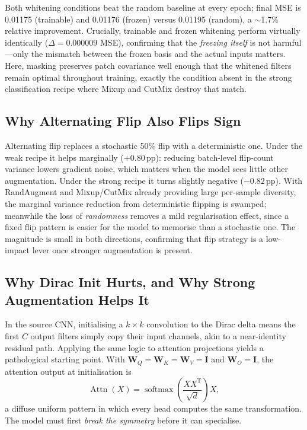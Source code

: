\documentclass[10pt,twocolumn]{article}
\newcommand{\pp}{\,pp}   %
\begin{document}
Both whitening conditions beat the random baseline at every epoch; final MSE is 0.01175 (trainable) and 0.01176 (frozen) versus 0.01195 (random), a $\sim$1.7\% relative improvement.
Crucially, trainable and frozen whitening perform virtually identically ($\Delta{=}0.000009$ MSE), confirming that the \emph{freezing itself} is not harmful---only the mismatch between the frozen basis and the actual inputs matters.
Here, masking preserves patch covariance well enough that the whitened filters remain optimal throughout training, exactly the condition absent in the strong classification recipe where Mixup and CutMix destroy that match.

\subsection{Why Alternating Flip Also Flips Sign}
Alternating flip replaces a stochastic 50\% flip with a deterministic one.
Under the weak recipe it helps marginally ($+0.80$\pp{}): reducing batch-level flip-count variance lowers gradient noise, which matters when the model sees little other augmentation.
Under the strong recipe it turns slightly negative ($-0.82$\pp{}).
With RandAugment and Mixup/CutMix already providing large per-sample diversity, the marginal variance reduction from deterministic flipping is swamped; meanwhile the loss of \emph{randomness} removes a mild regularisation effect, since a fixed flip pattern is easier for the model to memorise than a stochastic one.
The magnitude is small in both directions, confirming that flip strategy is a low-impact lever once stronger augmentation is present.

\subsection{Why Dirac Init Hurts, and Why Strong Augmentation Helps It}\label{sec:dirac-analysis}
In the source CNN, initialising a $k\times k$ convolution to the Dirac delta means the first $C$ output filters simply copy their input channels, akin to a near-identity residual path.
Applying the same logic to attention projections yields a pathological starting point.
With $\mathbf{W}_Q = \mathbf{W}_K = \mathbf{W}_V = \mathbf{I}$ and $\mathbf{W}_O = \mathbf{I}$, the attention output at initialisation is
\begin{equation}
    \operatorname{Attn} \!\left( X \right) =
    \operatorname{softmax} \!\left( \frac{ X X^\mathrm{T} }{ \sqrt{d} } \right) X,
\end{equation}
a diffuse uniform pattern in which every head computes the same transformation.
The model must first \emph{break the symmetry} before it can specialise.
\end{document}

